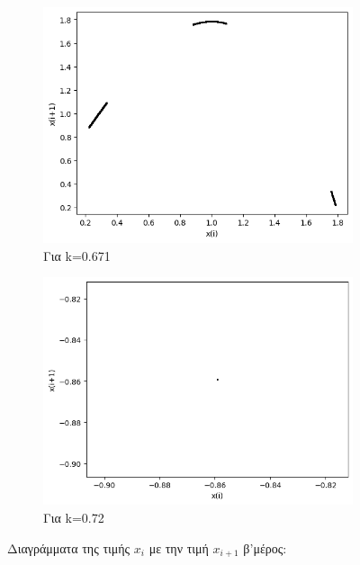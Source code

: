 \begin{figure}
\begin{subfigure}[b]{0.4\textwidth}
		\includegraphics[width=\textwidth]{LateX images/graphs q09/g11}
		\caption{Για k=0.671}
		\label{f:k57}
	\end{subfigure}
	\hfill
	\begin{subfigure}[b]{0.4\textwidth}
		\centering
		\includegraphics[width=\textwidth]{LateX images/graphs q09/g12}
		\caption{Για k=0.72}
		\label{f:k58}
	\end{subfigure}
	\hfill
	\caption{Διαγράμματα της τιμής \(x_i\) με την τιμή \(x_{i+1}\) β'μέρος:}
\end{figure}

\clearpage

